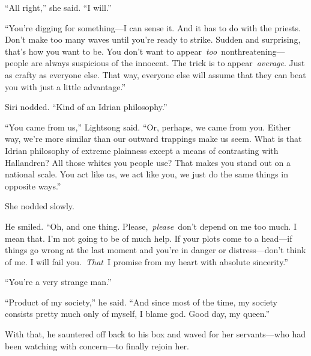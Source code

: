 “All right,” she said. “I will.”

“You’re digging for something—I can sense it. And it has to do with the priests. Don’t make too many waves until you’re ready to strike. Sudden and surprising, that’s how you want to be. You don’t want to appear~\textit{too}~nonthreatening—people are always suspicious of the innocent. The trick is to appear~\textit{average}. Just as crafty as everyone else. That way, everyone else will assume that they can beat you with just a little advantage.”

Siri nodded. “Kind of an Idrian philosophy.”

“You came from us,” Lightsong said. “Or, perhaps, we came from you. Either way, we’re more similar than our outward trappings make us seem. What is that Idrian philosophy of extreme plainness except a means of contrasting with Hallandren? All those whites you people use? That makes you stand out on a national scale. You act like us, we act like you, we just do the same things in opposite ways.”

She nodded slowly.

He smiled. “Oh, and one thing. Please,~\textit{please}~don’t depend on me too much. I mean that. I’m not going to be of much help. If your plots come to a head—if things go wrong at the last moment and you’re in danger or distress—don’t think of me. I will fail you.~\textit{That}~I promise from my heart with absolute sincerity.”

“You’re a very strange man.”

“Product of my society,” he said. “And since most of the time, my society consists pretty much only of myself, I blame god. Good day, my queen.”

With that, he sauntered off back to his box and waved for her servants—who had been watching with concern—to finally rejoin her.

